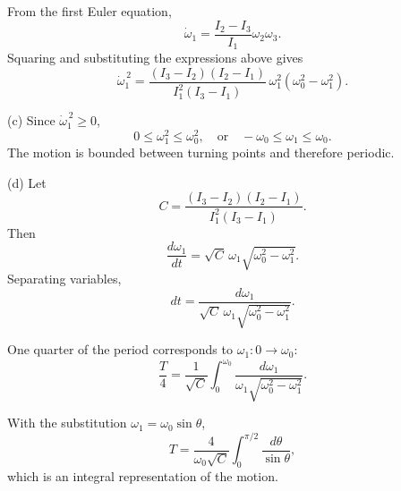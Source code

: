 \documentclass[12pt]{article}
\begin{document}
From the first Euler equation,
\[
\dot{\omega}_1=\frac{I_2-I_3}{I_1}\omega_2\omega_3.
\]
Squaring and substituting the expressions above gives
\[
\boxed{
\dot{\omega}_1^{\,2}
=
\frac{(I_3-I_2)(I_2-I_1)}{I_1^2(I_3-I_1)}
\,\omega_1^2(\omega_0^2-\omega_1^2)
}.
\]



(c) Since \(\dot{\omega}_1^{\,2}\ge0\),
\[
0\le \omega_1^2\le \omega_0^2,
\quad\text{or}\quad
-\omega_0\le\omega_1\le\omega_0.
\]
The motion is bounded between turning points and therefore periodic.


(d) Let
\[
C=\frac{(I_3-I_2)(I_2-I_1)}{I_1^2(I_3-I_1)}.
\]
Then
\[
\frac{d\omega_1}{dt}
=
\sqrt{C}\,\omega_1\sqrt{\omega_0^2-\omega_1^2}.
\]
Separating variables,
\[
dt
=
\frac{d\omega_1}{\sqrt{C}\,\omega_1\sqrt{\omega_0^2-\omega_1^2}}.
\]

One quarter of the period corresponds to \(\omega_1:0\to\omega_0\):
\[
\frac{T}{4}
=
\frac{1}{\sqrt{C}}
\int_0^{\omega_0}
\frac{d\omega_1}{\omega_1\sqrt{\omega_0^2-\omega_1^2}}.
\]

With the substitution \(\omega_1=\omega_0\sin\theta\),
\[
\boxed{
T
=
\frac{4}{\omega_0\sqrt{C}}
\int_0^{\pi/2}\frac{d\theta}{\sin\theta}
},
\]
which is an integral representation of the motion.
\end{document}
